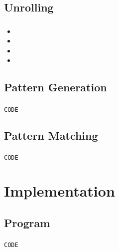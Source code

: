 \documentclass{beamer}
\begin{document}
\begin{frame} [fragile]
\frametitle{} 

\end{frame}

\subsection{Unrolling}
\begin{frame}
\frametitle{} 

\end{frame}

\begin{frame} [fragile] 
\frametitle{} 

\begin{itemize}
    \item 
    \item 
    \item 
    \item 
  \end{itemize}
  
\end{frame}

\subsection{Pattern Generation}
\begin{frame} [fragile] 
\frametitle{} 

\begin{lstlisting}[frame=single,basicstyle=\tiny,language=C]
CODE
\end{lstlisting}
\end{frame}

\subsection{Pattern Matching}
\begin{frame} [fragile] 
\frametitle{} 

\begin{lstlisting}[frame=single,basicstyle=\tiny,language=C]
CODE
\end{lstlisting}
\end{frame}

\section{Implementation}
\subsection{Program} 
\begin{frame} [fragile] 
\frametitle{} 

\begin{lstlisting}[frame=single,basicstyle=\tiny,language=C]
CODE
\end{lstlisting}
\end{frame}
\end{document}
